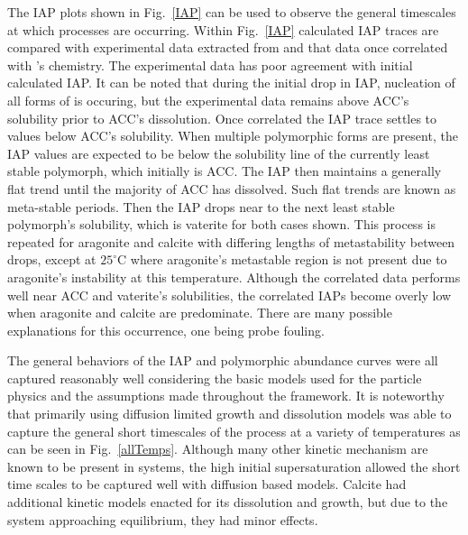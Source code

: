 \documentclass[preprint,3p,a4paper,times,12pt,authoryear]{elsarticle}
\begin{document}
The IAP plots shown in Fig.~\ref{IAP} can be used to observe the general timescales at which processes are occurring.  Within Fig.~\ref{IAP} calculated IAP traces are compared with experimental data extracted from \cite{Ogino1987} and that data once correlated with \cite{Cantera}'s chemistry.  The experimental data has poor agreement with initial calculated IAP.  It can be noted that during the initial drop in IAP, nucleation of all forms of  is occuring, but the experimental data remains above ACC's solubility prior to ACC's dissolution.  Once correlated the IAP trace settles to values below ACC's solubility.  When multiple polymorphic forms are present, the IAP values are expected to be below the solubility line of the currently least stable polymorph, which initially is ACC.  The IAP then maintains a generally flat trend until the majority of ACC has dissolved.  Such flat trends are known as meta-stable periods. Then the IAP drops near to the next least stable polymorph's solubility, which is vaterite for both cases shown.  This process is repeated for aragonite and calcite with differing lengths of metastability between drops, except at $25^\circ$C where aragonite's metastable region is not present due to aragonite's instability at this temperature.  Although the correlated data performs well near ACC and vaterite's solubilities, the correlated IAPs become overly low when aragonite and calcite are predominate.  There are many possible explanations for this occurrence, one being probe fouling.


The general behaviors of the IAP and polymorphic abundance curves were all captured reasonably well considering the basic models used for the particle physics and the assumptions made throughout the framework.  It is noteworthy that primarily using diffusion limited growth and dissolution models was able to capture the general short timescales of the process at a variety of temperatures as can be seen in Fig.~\ref{allTemps}.  Although many other kinetic mechanism are known to be present in  systems, the high initial supersaturation allowed the short time scales to be captured well with diffusion based models.  Calcite had additional kinetic models enacted for its dissolution and growth, but due to the system approaching equilibrium, they had minor effects.  
\end{document}
